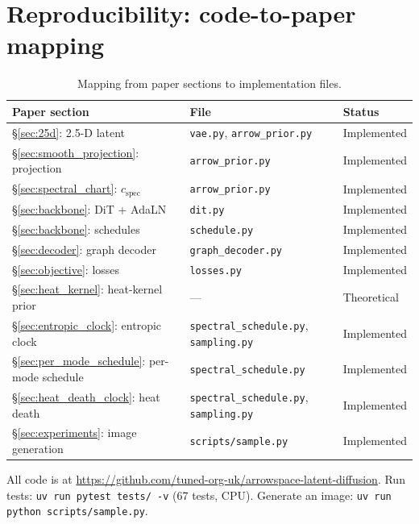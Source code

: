 \documentclass[11pt]{article}
\begin{document}
    \appendix
    \section{Reproducibility: code-to-paper mapping}
    \label{sec:reproducibility}

    \begin{table}[ht]
    \centering
    \small
    \caption{Mapping from paper sections to implementation files.}
    \label{tab:reproducibility}
    \begin{tabular}{lll}
    \toprule
    \textbf{Paper section} & \textbf{File} & \textbf{Status} \\
    \midrule
    \S\ref{sec:25d}: 2.5-D latent & \texttt{vae.py}, \texttt{arrow\_prior.py} & Implemented \\
    \S\ref{sec:smooth_projection}: projection & \texttt{arrow\_prior.py} & Implemented \\
    \S\ref{sec:spectral_chart}: $c_{\mathrm{spec}}$ & \texttt{arrow\_prior.py} & Implemented \\
    \S\ref{sec:backbone}: DiT + AdaLN & \texttt{dit.py} & Implemented \\
    \S\ref{sec:backbone}: schedules & \texttt{schedule.py} & Implemented \\
    \S\ref{sec:decoder}: graph decoder & \texttt{graph\_decoder.py} & Implemented \\
    \S\ref{sec:objective}: losses & \texttt{losses.py} & Implemented \\
    \S\ref{sec:heat_kernel}: heat-kernel prior & --- & Theoretical \\
    \S\ref{sec:entropic_clock}: entropic clock & \texttt{spectral\_schedule.py}, \texttt{sampling.py} & Implemented \\
    \S\ref{sec:per_mode_schedule}: per-mode schedule & \texttt{spectral\_schedule.py} & Implemented \\
    \S\ref{sec:heat_death_clock}: heat death & \texttt{spectral\_schedule.py}, \texttt{sampling.py} & Implemented \\
    \S\ref{sec:experiments}: image generation & \texttt{scripts/sample.py} & Implemented \\
    \bottomrule
    \end{tabular}
    \end{table}

    All code is at
    \url{https://github.com/tuned-org-uk/arrowspace-latent-diffusion}.
    Run tests: \texttt{uv run pytest tests/ -v} (67 tests, CPU).
    Generate an image: \texttt{uv run python scripts/sample.py}.
\end{document}

